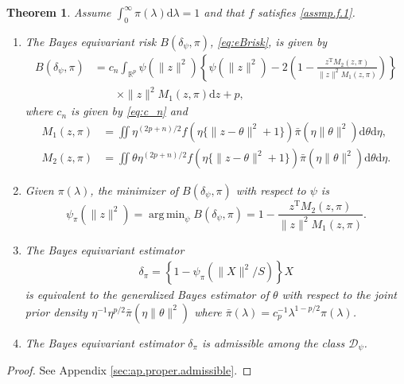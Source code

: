 \documentclass[preprint,11pt]{imsart}
\numberwithin{equation}{section}
\theoremstyle{plain}
\newtheorem{thm}{Theorem}[section]
\theoremstyle{definition}
\theoremstyle{remark}
\def\T{{ \mathrm{\scriptscriptstyle T} }}
\newcommand{\rd}{\mathrm{d}}
\DeclareMathOperator*{\argmin}{arg\,min}
\begin{document}
\begin{thm}\label{thm:proper.admissible}
Assume $\int_0^\infty\pi(\lambda) \rd \lambda=1$ and that $f$ satisfies \eqref{assmp.f.1}.
 \begin{enumerate}
  \item \label{thm:proper.admissible.0}
	The Bayes equivariant risk $B(\delta_\psi, \pi)$, \eqref{eq:eBrisk}, is given by
\begin{equation}\label{eq:Bayesequivrisk.thm}
 \begin{split}
 B(\delta_\psi, \pi) &=
  c_n\int_{\mathbb{R}^p}
  \psi(\|z\|^2)\left\{\psi(\|z\|^2) -2\left(1-\frac{z^\T M_2(z,\pi)}{\|z\|^2 M_1(z,\pi)}\right)\right\}\\
  &\qquad \times
  \|z\|^2 M_1(z,\pi) \rd z +p,
\end{split}
\end{equation}
      where $c_n$ is given by \eqref{eq:c_n} and 
\begin{equation}\label{eq:thm:proper.admissible.M1.M2}
	\begin{split}
  M_1(z,\pi)&=
 \iint \eta^{(2p+n)/2}f(\eta\{\|z-\theta\|^2+1\})
\bar{\pi}(\eta\|\theta\|^2) \rd \theta   \rd \eta,  \\
 M_2(z,\pi)&=
\iint \theta
  \eta^{(2p+n)/2} f(\eta\{\|z-\theta\|^2+1\}) \bar{\pi}(\eta\|\theta\|^2) \rd \theta  \rd \eta.
	\end{split}      
\end{equation}
  \item \label{thm:proper.admissible.1}
	Given $\pi(\lambda)$, the minimizer of $B(\delta_\psi, \pi)$ with respect to $\psi$ 
      is
\begin{equation}\label{eq:eq_Bayes_sol.thm}
\psi_\pi(\|z\|^2)= \argmin_\psi B(\delta_\psi, \pi) =1-\frac{z^\T M_2(z,\pi)}{\|z\|^2 M_1(z,\pi)}.
\end{equation}
  \item \label{thm:proper.admissible.2}
	The Bayes equivariant estimator
\begin{align}\label{eq:delta_pi_thm}
\delta_\pi=\left\{1- \psi_\pi(\|X\|^2/S)\right\}X
\end{align}
	is equivalent to the generalized Bayes estimator of $\theta$ with respect to
	the joint prior density $\eta^{-1}\eta^{p/2}\bar{\pi}(\eta\|\theta\|^2)$
	where $\bar{\pi}(\lambda)=c_p^{-1}\lambda^{1-p/2}\pi(\lambda)$.
  \item \label{thm:proper.admissible.3}
	The Bayes equivariant estimator $\delta_\pi$ is admissible among the class $\mathcal{D}_\psi$.
 \end{enumerate}
\end{thm}
\begin{proof}
 See Appendix \ref{sec:ap.proper.admissible}.
\end{proof}
\end{document}
